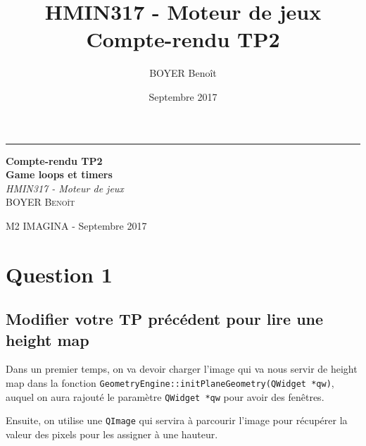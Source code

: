 \documentclass[a4paper,11pt]{report}
\title{HMIN317 - Moteur de jeux \\ Compte-rendu TP2}
\author{BOYER Benoît}
\date{Septembre 2017}
\begin{document}
  	  \begin{titlepage} %
	
	  \raggedleft %
	
	  \rule{1pt}{\textheight} %
	  \hspace{0.05\textwidth} %
	  \parbox[b]{0.75\textwidth}{ %
		
		  {\Huge\bfseries Compte-rendu TP2 \\[0.5\baselineskip] Game loops et timers}\\[2\baselineskip] %
		  {\large\textit{HMIN317 - Moteur de jeux}}\\[4\baselineskip] %
		  {\Large\textsc{BOYER Benoît}} %
		
		  \vspace{0.5\textheight} %
		
		  {\noindent M2 IMAGINA - Septembre 2017}\\[\baselineskip] %
	  }

  \end{titlepage}
  
    \tableofcontents
	\pagebreak


    \section{Question 1}
    \subsection{Modifier votre TP précédent pour lire une height map}
    Dans un premier temps, on va devoir charger l'image qui va nous servir de height map dans la fonction \texttt{GeometryEngine::initPlaneGeometry(QWidget *qw)}, auquel on aura rajouté le paramètre \texttt{QWidget *qw} pour avoir des fenêtres.
    
    Ensuite, on utilise une \texttt{QImage} qui servira à parcourir l'image pour récupérer la valeur des pixels pour les assigner à une hauteur.
    
\end{document}
